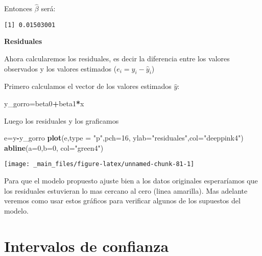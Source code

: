 \documentclass[
  a4paper,
  oneside,
  openany]{book}
\newenvironment{Shaded}{\begin{snugshade}}{\end{snugshade}}
\newcommand{\AttributeTok}[1]{\textcolor[rgb]{0.13,0.29,0.53}{#1}}
\newcommand{\DecValTok}[1]{\textcolor[rgb]{0.00,0.00,0.81}{#1}}
\newcommand{\FunctionTok}[1]{\textcolor[rgb]{0.13,0.29,0.53}{\textbf{#1}}}
\newcommand{\NormalTok}[1]{#1}
\newcommand{\OtherTok}[1]{\textcolor[rgb]{0.56,0.35,0.01}{#1}}
\newcommand{\SpecialCharTok}[1]{\textcolor[rgb]{0.81,0.36,0.00}{\textbf{#1}}}
\newcommand{\StringTok}[1]{\textcolor[rgb]{0.31,0.60,0.02}{#1}}
\begin{document}
Entonces \(\hat{\beta}\) será:

\begin{verbatim}
[1] 0.01503001
\end{verbatim}

\textbf{Residuales}

Ahora calcularemos los residuales, es decir la diferencia entre los valores observados y los valores estimados (\(e_i = y_i-\hat{y}_i\))

Primero calculamos el vector de los valores estimados \(\hat{y}\):

\begin{Shaded}
\begin{Highlighting}[]
\NormalTok{y\_gorro}\OtherTok{=}\NormalTok{beta0}\SpecialCharTok{+}\NormalTok{beta1}\SpecialCharTok{*}\NormalTok{x}
\end{Highlighting}
\end{Shaded}

Luego los residuales y los graficamos

\begin{Shaded}
\begin{Highlighting}[]
\NormalTok{e}\OtherTok{=}\NormalTok{y}\SpecialCharTok{{-}}\NormalTok{y\_gorro }
\FunctionTok{plot}\NormalTok{(e,}\AttributeTok{type =} \StringTok{"p"}\NormalTok{,}\AttributeTok{pch=}\DecValTok{16}\NormalTok{, }\AttributeTok{ylab=}\StringTok{"residuales"}\NormalTok{,}\AttributeTok{col=}\StringTok{"deeppink4"}\NormalTok{) }
\FunctionTok{abline}\NormalTok{(}\AttributeTok{a=}\DecValTok{0}\NormalTok{,}\AttributeTok{b=}\DecValTok{0}\NormalTok{, }\AttributeTok{col=}\StringTok{"green4"}\NormalTok{)}
\end{Highlighting}
\end{Shaded}

\begin{center}\texttt{[image: \_main\_files/figure-latex/unnamed-chunk-81-1]} \end{center}

Para que el modelo propuesto ajuste bien a los datos originales esperaríamos que los residuales estuvieran lo mas cercano al cero (linea amarilla). Mas adelante veremos como usar estos gráficos para verificar algunos de los supuestos del modelo.

\hypertarget{intervalos-de-confianza-1}{%
\chapter{Intervalos de confianza}\label{intervalos-de-confianza-1}}
\end{document}
